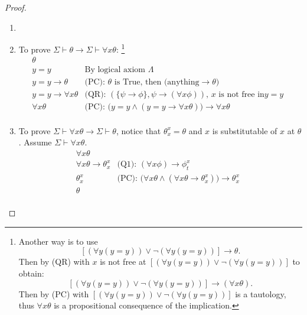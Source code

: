 \documentclass[11pt,letterpaper]{book}
\theoremstyle{definition}
\begin{document}
\begin{proof}

\begin{enumerate}
\item[]
\item{To prove $\Sigma \vdash \theta \rightarrow \Sigma \vdash \forall x
\theta$: \footnote{Another way is to use
$$ [ (\forall y (y=y)) \lor \lnot (\forall y (y=y) ) ] \rightarrow
\theta .$$
Then by (QR) with $x$ is not free at $[ (\forall y (y=y)) \lor \lnot
(\forall y (y=y) ) ]$ to obtain:
$$[ (\forall y (y=y)) \lor \lnot (\forall y (y=y) ) ] \rightarrow
(\forall x \theta) . $$
Then by (PC) with $[ (\forall y (y=y)) \lor \lnot (\forall y (y=y) ) ]$
is a tautology, thus $\forall x \theta$ is a propositional consequence
of the implication.
}
}
\begin{equation}
\begin{array}{ll}
\theta &  \\
y = y & \text{By logical axiom } \Lambda  \\
y = y \rightarrow \theta & \text{(PC): $\theta$ is True, then (anything
$\rightarrow \theta$)} \\
y=y \rightarrow \forall x \theta & \text{(QR): $( \{ \psi \rightarrow
\phi \} , \psi \rightarrow (\forall x \phi)  )$, $x$ is not free in
$y=y$ }\\
\forall x \theta & \text{(PC): } \big( y=y \land (y=y \rightarrow
\forall x \theta) \big) \rightarrow \forall x \theta \\
\end{array} \nonumber
\end{equation}

\item{To prove $ \Sigma \vdash \forall x \theta \rightarrow \Sigma
\vdash \theta$, notice that $\theta_x ^x = \theta$ and $x$ is
substitutable of $x$ at $\theta$. Assume $\Sigma \vdash \forall x \theta$.}
\begin{equation}
\begin{array}{ll}
\forall x \theta & \\
\forall x \theta \rightarrow \theta_x ^x & \text{(Q1): $(\forall x \phi)
\rightarrow \phi_t ^x $} \\
\theta_x ^x & \text{(PC): $\big(\forall x \theta \land (\forall x \theta
\rightarrow \theta_x ^x) \big) \rightarrow \theta_x ^x$ } \\
\theta & \\
\end{array}\nonumber
\end{equation}
\end{enumerate}

\end{proof}
\end{document}
